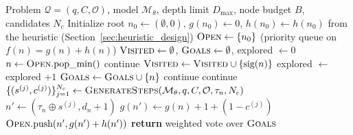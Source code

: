 \documentclass[10pt]{article}
\begin{document}
\begin{algorithm}[t]
\caption{Budgeted A* Search over Reasoning Traces}
\label{alg:astar}
\begin{algorithmic}[1]
\REQUIRE Problem $\mathcal{Q}=(q,C,\mathcal{O})$, model $\mathcal{M}_\theta$, depth limit $D_{\max}$, node budget $B$, candidates $N_c$
\STATE Initialize root $n_0 \gets (\emptyset,0)$, $g(n_0) \gets 0$, $h(n_0) \gets h(n_0)$ from the heuristic (Section~\ref{sec:heuristic_design})
\STATE $\textsc{Open} \gets \{n_0\}$ (priority queue on $f(n)=g(n)+h(n)$)
\STATE $\textsc{Visited} \gets \emptyset$, $\textsc{Goals} \gets \emptyset$, explored $\gets 0$
    \STATE $n \gets \textsc{Open}.\text{pop\_min}()$
        \STATE continue
    \ENDIF
    \STATE $\textsc{Visited} \gets \textsc{Visited} \cup \{\text{sig}(n)\}$
    \STATE explored $\gets$ explored $+ 1$
        \STATE $\textsc{Goals} \gets \textsc{Goals} \cup \{n\}$
        \STATE continue
    \ENDIF
        \STATE continue
    \ENDIF
    \STATE $\{(s^{(j)}, c^{(j)})\}_{j=1}^{N_c} \gets \textsc{GenerateSteps}(\mathcal{M}_\theta, q, C, \mathcal{O}, \tau_n, N_c)$
        \STATE $n' \gets (\tau_n \oplus s^{(j)}, d_n+1)$
        \STATE $g(n') \gets g(n) + 1 + (1-c^{(j)})$
        \STATE $\textsc{Open}.\text{push}(n', g(n') + h(n'))$
    \ENDFOR
\ENDWHILE
\STATE \textbf{return} weighted vote over $\textsc{Goals}$
\end{algorithmic}
\end{algorithm}
\end{document}
